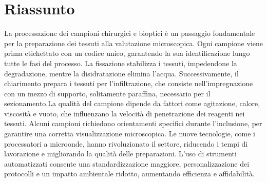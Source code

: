 \section{Riassunto}
La processazione dei campioni chirurgici e bioptici è un passaggio fondamentale per la preparazione dei tessuti alla valutazione microscopica. Ogni campione viene prima etichettato con un codice unico, garantendo la sua identificazione lungo tutte le fasi del processo. La fissazione stabilizza i tessuti, impedendone la degradazione, mentre la disidratazione elimina l'acqua. Successivamente, il chiarimento prepara i tessuti per l'infiltrazione, che consiste nell'impregnazione con un mezzo di supporto, solitamente paraffina, necessario per il sezionamento.La qualità del campione dipende da fattori come agitazione, calore, viscosità e vuoto, che influenzano la velocità di penetrazione dei reagenti nei tessuti. Alcuni campioni richiedono orientamenti specifici durante l'inclusione, per garantire una corretta visualizzazione microscopica. Le nuove tecnologie, come i processatori a microonde, hanno rivoluzionato il settore, riducendo i tempi di lavorazione e migliorando la qualità delle preparazioni. L'uso di strumenti automatizzati consente una standardizzazione maggiore, personalizzazione dei protocolli e un impatto ambientale ridotto, aumentando efficienza e affidabilità.
